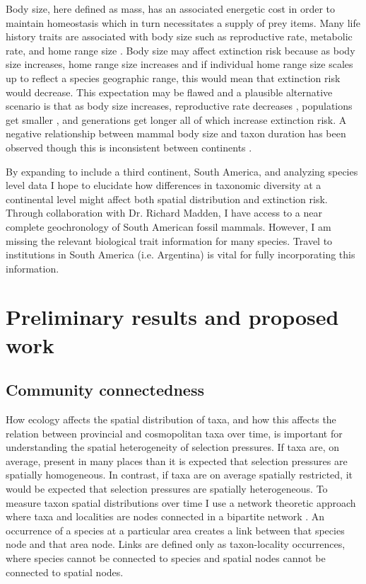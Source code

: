 \documentclass[11pt,letterpaper]{article}
\begin{document}
Body size, here defined as mass, has an associated energetic cost in order to maintain homeostasis which in turn necessitates a supply of prey items. Many life history traits are associated with body size such as reproductive rate, metabolic rate, and home range size \cite{Peters1983a,Damuth1979,Brown1987,Smith2004}. Body size may affect extinction risk because as body size increases, home range size increases \citep{Damuth1979} and if individual home range size scales up to reflect a species geographic range, this would mean that extinction risk would decrease. This expectation may be flawed and a plausible alternative scenario is that as body size increases, reproductive rate decreases \citep{Johnson2002b}, populations get smaller \citep{White2007}, and generations get longer \citep{Martin1993a} all of which increase extinction risk. A negative relationship between mammal body size and taxon duration has been observed \citep{Liow2008,Davidson2012} though this is inconsistent between continents \citep{Tomiya2013,Liow2008}. 

By expanding to include a third continent, South America, and analyzing species level data I hope to elucidate how differences in taxonomic diversity at a continental level might affect both spatial distribution and extinction risk. Through collaboration with Dr. Richard Madden, I have access to a near complete geochronology of South American fossil mammals. However, I am missing the relevant biological trait information for many species. Travel to institutions in South America (i.e. Argentina) is vital for fully incorporating this information.

\section{Preliminary results and proposed work}
\subsection{Community connectedness}
How ecology affects the spatial distribution of taxa, and how this affects the relation between provincial and cosmopolitan taxa over time, is important for understanding the spatial heterogeneity of selection pressures. If taxa are, on average, present in many places than it is expected that selection pressures are spatially homogeneous. In contrast, if taxa are on average spatially restricted, it would be expected that selection pressures are spatially heterogeneous. To measure taxon spatial distributions over time I use a network theoretic approach where taxa and localities are nodes connected in a bipartite network \citep{Sidor2013,Vilhena2013,Vilhena2013b}. An occurrence of a species at a particular area creates a link between that species node and that area node. Links are defined only as taxon-locality occurrences, where species cannot be connected to species and spatial nodes cannot be connected to spatial nodes. %
\end{document}
